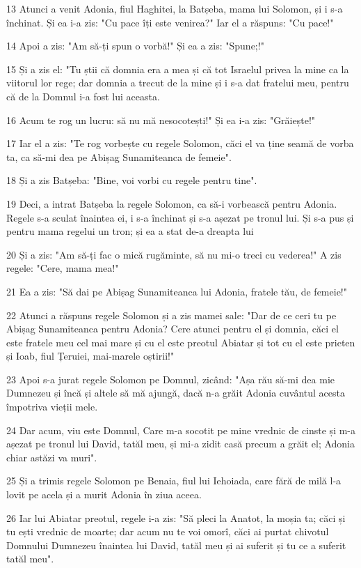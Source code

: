 \par 13 Atunci a venit Adonia, fiul Haghitei, la Batșeba, mama lui Solomon, și i s-a închinat. Și ea i-a zis: "Cu pace îți este venirea?" Iar el a răspuns: "Cu pace!"
\par 14 Apoi a zis: "Am să-ți spun o vorbă!" Și ea a zis: "Spune;!"
\par 15 Și a zis el: "Tu știi că domnia era a mea și că tot Israelul privea la mine ca la viitorul lor rege; dar domnia a trecut de la mine și i s-a dat fratelui meu, pentru că de la Domnul i-a fost lui aceasta.
\par 16 Acum te rog un lucru: să nu mă nesocotești!" Și ea i-a zis: "Grăiește!"
\par 17 Iar el a zis: "Te rog vorbește cu regele Solomon, căci el va ține seamă de vorba ta, ca să-mi dea pe Abișag Sunamiteanca de femeie".
\par 18 Și a zis Batșeba: "Bine, voi vorbi cu regele pentru tine".
\par 19 Deci, a intrat Batșeba la regele Solomon, ca să-i vorbească pentru Adonia. Regele s-a sculat înaintea ei, i s-a închinat și s-a așezat pe tronul lui. Și s-a pus și pentru mama regelui un tron; și ea a stat de-a dreapta lui
\par 20 Și a zis: "Am să-ți fac o mică rugăminte, să nu mi-o treci cu vederea!" A zis regele: "Cere, mama mea!"
\par 21 Ea a zis: "Să dai pe Abișag Sunamiteanca lui Adonia, fratele tău, de femeie!"
\par 22 Atunci a răspuns regele Solomon și a zis mamei sale: "Dar de ce ceri tu pe Abișag Sunamiteanca pentru Adonia? Cere atunci pentru el și domnia, căci el este fratele meu cel mai mare și cu el este preotul Abiatar și tot cu el este prieten și Ioab, fiul Țeruiei, mai-marele oștirii!"
\par 23 Apoi s-a jurat regele Solomon pe Domnul, zicând: "Așa rău să-mi dea mie Dumnezeu și încă și altele să mă ajungă, dacă n-a grăit Adonia cuvântul acesta împotriva vieții mele.
\par 24 Dar acum, viu este Domnul, Care m-a socotit pe mine vrednic de cinste și m-a așezat pe tronul lui David, tatăl meu, și mi-a zidit casă precum a grăit el; Adonia chiar astăzi va muri".
\par 25 Și a trimis regele Solomon pe Benaia, fiul lui Iehoiada, care fără de milă l-a lovit pe acela și a murit Adonia în ziua aceea.
\par 26 Iar lui Abiatar preotul, regele i-a zis: "Să pleci la Anatot, la moșia ta; căci și tu ești vrednic de moarte; dar acum nu te voi omorî, căci ai purtat chivotul Domnului Dumnezeu înaintea lui David, tatăl meu și ai suferit și tu ce a suferit tatăl meu".
